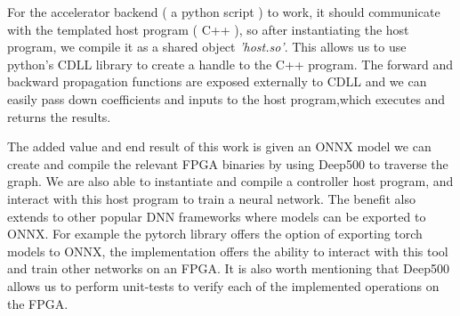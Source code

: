 For the accelerator backend ( a python script ) to work, it should communicate with the templated host program ( C++ ), so after instantiating the host program, we compile it as a shared object \emph{'host.so'}. This allows us to use python’s CDLL library to create a handle to the C++ program. The forward and backward propagation functions are exposed externally to CDLL and we can easily pass down coefficients and inputs to the host program,which executes and returns the results.

The added value and end result of this work is given an ONNX model we can create and compile the relevant FPGA binaries by using Deep500 to traverse the graph. We are also able to instantiate and compile a controller host program, and interact with this host program to train a neural network. The benefit also extends to other popular DNN frameworks where models can be exported to ONNX. For example the pytorch\cite{torch} library offers the option of exporting torch models to ONNX, the implementation offers the ability to interact with this tool and train other networks on an FPGA. It is also worth mentioning that  Deep500 allows us to perform unit-tests to verify each of the implemented operations on the FPGA.

